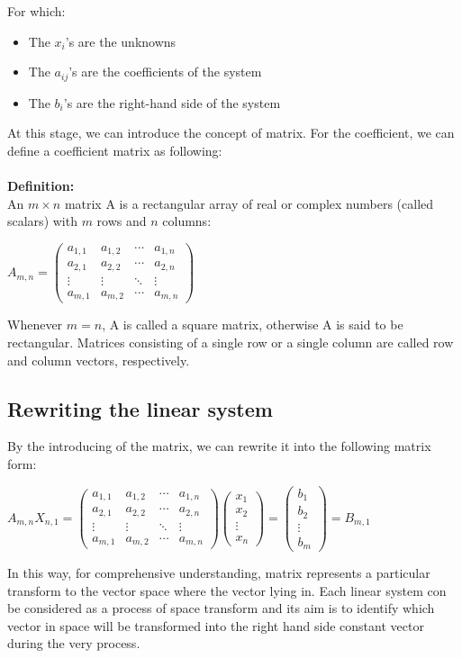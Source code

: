 \documentclass[UTF8,a4paper,11pt]{amsbook}
\begin{document}
For which:
\begin{itemize}
\item{The $x_i$'s are the unknowns}
\item{The $a_{ij}$'s are the coefficients of the system}
\item{The $b_i$'s are the right-hand side of the system}
\end{itemize}
At this stage, we can introduce the concept of matrix. For the coefficient, we can define a coefficient matrix as following:\\ \\
\textbf{Definition:}
\\An $m \times n$ matrix A is a rectangular array of real or complex numbers (called scalars) with $m$ rows and $n$ columns:
\begin{center}
$A_{m,n}=  
 \begin{pmatrix}
  a_{1,1} & a_{1,2} & \cdots & a_{1,n} \\
  a_{2,1} & a_{2,2} & \cdots & a_{2,n} \\
  \vdots  & \vdots  & \ddots & \vdots  \\
  a_{m,1} & a_{m,2} & \cdots & a_{m,n} 
 \end{pmatrix}$\\
\end{center}
Whenever $m = n$, A is called a square matrix, otherwise A is said to be rectangular. Matrices consisting of a single row or a single column are called row and column vectors, respectively. 
\subsection{Rewriting the linear system}
By the introducing of the matrix, we can rewrite it into the following matrix form:
\begin{center}
$A_{m,n}X_{n,1}= 
 \begin{pmatrix}
  a_{1,1} & a_{1,2} & \cdots & a_{1,n} \\
  a_{2,1} & a_{2,2} & \cdots & a_{2,n} \\
  \vdots  & \vdots  & \ddots & \vdots  \\
  a_{m,1} & a_{m,2} & \cdots & a_{m,n} 
 \end{pmatrix} 
 \begin{pmatrix}
  x_{1}\\
  x_{2}\\
  \vdots \\
  x_{n} 
 \end{pmatrix}=
 \begin{pmatrix}
  b_{1}\\
  b_{2}\\
  \vdots \\
  b_{m} 
 \end{pmatrix}
 =B_{m,1}$
\end{center}
In this way, for comprehensive understanding, matrix represents a particular transform to the vector space where the vector lying in. Each linear system con be considered as a process of space transform and its aim is to identify which vector in space will be transformed into the right hand side constant vector during the very process.
\end{document}
